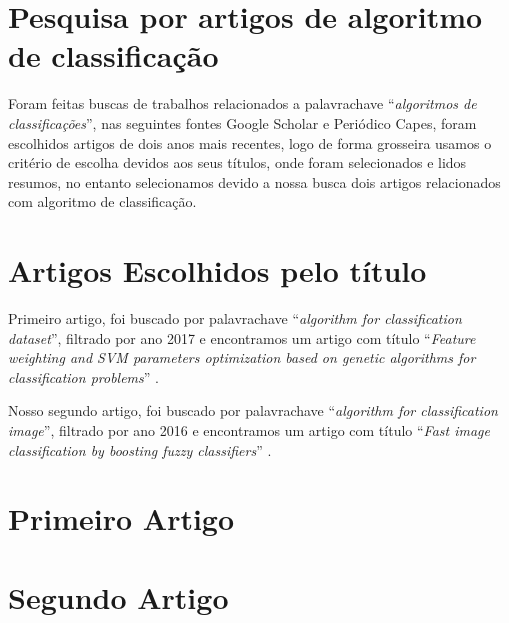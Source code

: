 \documentclass[12pt,a4paper,letterpaper]{article}
\newcommand\wb[1]{\discretionary{#1}{#1}{#1}}
\begin{document}
\section{Pesquisa por artigos de algoritmo de classificação}

Foram feitas buscas de trabalhos relacionados a palavra\wb-chave
``\textit{algoritmos de classificações}'', nas seguintes fontes Google Scholar e
Periódico Capes, foram escolhidos artigos de dois anos mais recentes, logo de
forma grosseira usamos o critério de escolha devidos aos seus títulos, onde
foram selecionados e lidos resumos, no entanto selecionamos devido a nossa busca
dois artigos relacionados com algoritmo de classificação.

\section{Artigos Escolhidos pelo título}

Primeiro artigo, foi buscado por palavra\wb-chave ``\textit{algorithm for
classification dataset}'', filtrado por ano 2017 e encontramos um artigo com
título ``\textit{Feature weighting and SVM parameters optimization based on
genetic algorithms for classification problems}'' \autocite{PHAN2017}.

Nosso segundo artigo, foi buscado por palavra\wb-chave ``\textit{algorithm for
classification image}'', filtrado por ano 2016 e encontramos um artigo com
título ``\textit{Fast image classification by boosting fuzzy classifiers}''
\autocite{KORYTKOWSKI2016}.

\section{Primeiro Artigo}
\autocite{PHAN2017}

\section{Segundo Artigo}
\autocite{KORYTKOWSKI2016}

\pagebreak
\medskip
\printbibliography[
    heading=bibintoc,
    title={Referências Bibliográficas}
]
\end{document}
